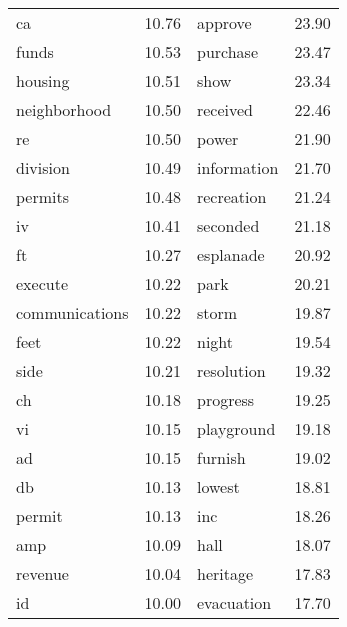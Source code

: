 \begin{table}[ht]
\begin{tabular}{lrlr}
  ca & 10.76 & approve & 23.90 \\ 
  funds & 10.53 & purchase & 23.47 \\ 
  housing & 10.51 & show & 23.34 \\ 
  neighborhood & 10.50 & received & 22.46 \\ 
  re & 10.50 & power & 21.90 \\ 
  division & 10.49 & information & 21.70 \\ 
  permits & 10.48 & recreation & 21.24 \\ 
  iv & 10.41 & seconded & 21.18 \\ 
  ft & 10.27 & esplanade & 20.92 \\ 
  execute & 10.22 & park & 20.21 \\ 
  communications & 10.22 & storm & 19.87 \\ 
  feet & 10.22 & night & 19.54 \\ 
  side & 10.21 & resolution & 19.32 \\ 
  ch & 10.18 & progress & 19.25 \\ 
  vi & 10.15 & playground & 19.18 \\ 
  ad & 10.15 & furnish & 19.02 \\ 
  db & 10.13 & lowest & 18.81 \\ 
  permit & 10.13 & inc & 18.26 \\ 
  amp & 10.09 & hall & 18.07 \\ 
  revenue & 10.04 & heritage & 17.83 \\ 
  id & 10.00 & evacuation & 17.70 \\ 
   \hline
\end{tabular}
\end{table}

